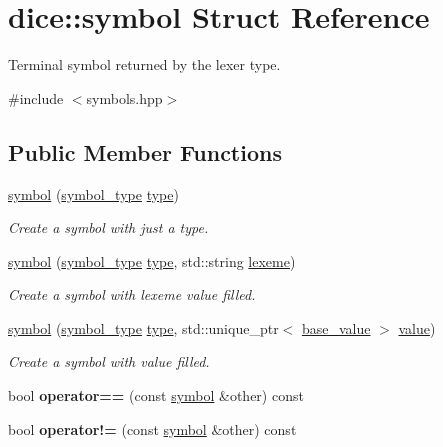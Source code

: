 \hypertarget{structdice_1_1symbol}{}\section{dice\+:\+:symbol Struct Reference}
\label{structdice_1_1symbol}


Terminal symbol returned by the lexer type.  




{\ttfamily \#include $<$symbols.\+hpp$>$}

\subsection*{Public Member Functions}
\begin{DoxyCompactItemize}
\item 
\mbox{\hyperlink{structdice_1_1symbol_a4d35cdd398636ca61822f3c024ed122c}{symbol}} (\mbox{\hyperlink{symbols_8hpp_ab0295a855bb7eadc138abd6993af3aea}{symbol\+\_\+type}} \mbox{\hyperlink{structdice_1_1symbol_a3bb3109342d99a01c7534c00877857db}{type}})
\begin{DoxyCompactList}\small\item\em Create a symbol with just a type. \end{DoxyCompactList}\item 
\mbox{\hyperlink{structdice_1_1symbol_a5554a3a825bb97c3961b069963af63d8}{symbol}} (\mbox{\hyperlink{symbols_8hpp_ab0295a855bb7eadc138abd6993af3aea}{symbol\+\_\+type}} \mbox{\hyperlink{structdice_1_1symbol_a3bb3109342d99a01c7534c00877857db}{type}}, std\+::string \mbox{\hyperlink{structdice_1_1symbol_abef11b61a11ced6140a6e1626bce0350}{lexeme}})
\begin{DoxyCompactList}\small\item\em Create a symbol with lexeme value filled. \end{DoxyCompactList}\item 
\mbox{\hyperlink{structdice_1_1symbol_a30caf2c6b632e0a35f584fcac22d0c0c}{symbol}} (\mbox{\hyperlink{symbols_8hpp_ab0295a855bb7eadc138abd6993af3aea}{symbol\+\_\+type}} \mbox{\hyperlink{structdice_1_1symbol_a3bb3109342d99a01c7534c00877857db}{type}}, std\+::unique\+\_\+ptr$<$ \mbox{\hyperlink{classdice_1_1base__value}{base\+\_\+value}} $>$ \mbox{\hyperlink{structdice_1_1symbol_a9575fe2bdb23550a1cbd1cb0bb0d1c4b}{value}})
\begin{DoxyCompactList}\small\item\em Create a symbol with value filled. \end{DoxyCompactList}\item 
\mbox{\label{structdice_1_1symbol_a8f096b612ef4c4547f6d4435371157db}} 
bool {\bfseries operator==} (const \mbox{\hyperlink{structdice_1_1symbol}{symbol}} \&other) const
\item 
\mbox{\label{structdice_1_1symbol_a5cb5c60000186c98d0630b568ea09d3a}} 
bool {\bfseries operator!=} (const \mbox{\hyperlink{structdice_1_1symbol}{symbol}} \&other) const
\end{DoxyCompactItemize}
